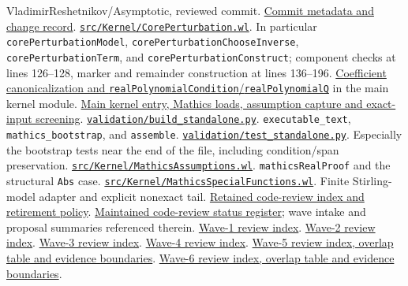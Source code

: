\documentclass[11pt,letterpaper]{article}
\newcommand{\code}[1]{\nolinkurl{#1}}
\newcommand{\src}[2]{\href{https://github.com/VladimirReshetnikov/Asymptotic/blob/efa1aeec4845a9c35e140963a0333d0c9ec33b05/#1}{#2}}
\begin{document}
\begin{thebibliography}{99}
\small\setlength{\itemsep}{1.5pt}\setlength{\parskip}{0pt}
 VladimirReshetnikov/Asymptotic, reviewed commit. \href{https://github.com/VladimirReshetnikov/Asymptotic/commit/efa1aeec4845a9c35e140963a0333d0c9ec33b05}{Commit metadata and change record}.
 \src{src/Kernel/CorePerturbation.wl}{\code{src/Kernel/CorePerturbation.wl}}. In particular \code{corePerturbationModel}, \code{corePerturbationChooseInverse}, \code{corePerturbationTerm}, and \code{corePerturbationConstruct}; component checks at lines 126--128, marker and remainder construction at lines 136--196.
 \src{src/Kernel/AsymptoticAnalysis.wl\#L228-L274}{Coefficient canonicalization and \code{realPolynomialCondition}/\code{realPolynomialQ}} in the main kernel module.
 \src{src/Kernel/AsymptoticAnalysis.wl\#L119-L193}{Main kernel entry, Mathics loads, assumption capture and exact-input screening}.
 \src{validation/build_standalone.py}{\code{validation/build_standalone.py}}. \code{executable_text}, \code{mathics_bootstrap}, and \code{assemble}.
 \src{validation/test_standalone.py}{\code{validation/test_standalone.py}}. Especially the bootstrap tests near the end of the file, including condition/span preservation.
 \src{src/Kernel/MathicsAssumptions.wl}{\code{src/Kernel/MathicsAssumptions.wl}}. \code{mathicsRealProof} and the structural \code{Abs} case.
 \src{src/Kernel/MathicsSpecialFunctions.wl}{\code{src/Kernel/MathicsSpecialFunctions.wl}}. Finite Stirling-model adapter and explicit nonexact tail.
 \src{external-reports/code-review/README.md}{Retained code-review index and retirement policy}.
 \src{docs/development/CODE_REVIEW_STATUS.md}{Maintained code-review status register}; wave intake and proposal summaries referenced therein.
 \src{external-reports/code-review/wave-1/README.md}{Wave-1 review index}.
 \src{external-reports/code-review/wave-2/README.md}{Wave-2 review index}.
 \src{external-reports/code-review/wave-3/README.md}{Wave-3 review index}.
 \src{external-reports/code-review/wave-4/README.md}{Wave-4 review index}.
 \src{external-reports/code-review/wave-5/README.md}{Wave-5 review index, overlap table and evidence boundaries}.
 \src{external-reports/code-review/wave-6/README.md}{Wave-6 review index, overlap table and evidence boundaries}.

\end{thebibliography}
\end{document}
